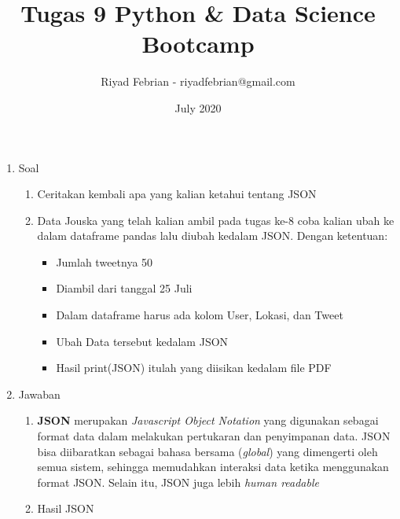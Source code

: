 \documentclass{report}
\title{Tugas 9 Python \& Data Science Bootcamp}
\author{Riyad Febrian - riyadfebrian@gmail.com}
\date{July 2020}
\begin{document}
\maketitle

\begin{enumerate} [label=\Alph*]
    \item Soal
    \begin{enumerate} [label=\arabic*]
        \item Ceritakan kembali apa yang kalian ketahui tentang JSON
        \item Data Jouska yang telah kalian ambil pada tugas ke-8 coba kalian ubah ke dalam dataframe pandas lalu diubah kedalam JSON. Dengan ketentuan:
            \begin{itemize}
                \item Jumlah tweetnya 50
                \item Diambil dari tanggal 25 Juli
                \item Dalam dataframe harus ada kolom User, Lokasi, dan Tweet
                \item Ubah Data tersebut kedalam JSON
                \item Hasil print(JSON) itulah yang diisikan kedalam file PDF
            \end{itemize}
    \end{enumerate}
    
    \item Jawaban
        \begin{enumerate}[label=\arabic*]
            \item  \textbf{JSON} merupakan \emph{Javascript Object Notation} yang digunakan sebagai format data dalam melakukan pertukaran dan penyimpanan data. JSON bisa diibaratkan sebagai bahasa bersama (\emph{global}) yang dimengerti oleh semua sistem, sehingga memudahkan interaksi data ketika menggunakan format JSON. Selain itu, JSON juga lebih \emph{human readable}
            
            \item Hasil JSON
              
        \end{enumerate}
        
        
    

\end{enumerate}
\end{document}
